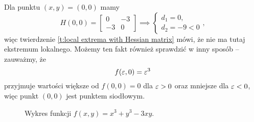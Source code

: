 \begin{solution}
    Dla punktu $(x, y) = (0, 0)$ mamy
    \[ H(0, 0) = \begin{bmatrix}
        0 & -3 \\
        -3 & 0
    \end{bmatrix} \implies \begin{cases} d_1 = 0,\\ d_2 = -9 < 0 \end{cases}, \]
    więc twierdzenie \ref{t:local extrema with Hessian matrix} mówi, że nie ma tutaj ekstremum lokalnego. Możemy ten fakt również sprawdzić w inny sposób -- zauważmy, że
    \[ f(\varepsilon, 0) = \varepsilon^3 \]
    przyjmuje wartości większe od $f(0, 0) = 0$ dla $\varepsilon > 0$ oraz mniejsze dla $\varepsilon < 0$, więc punkt $(0, 0)$ jest punktem siodłowym.
\end{solution}

\begin{figure}[H]
    \centering
    \caption{Wykres funkcji $f(x, y) = x^3 + y^3 - 3xy$.}
\end{figure}

